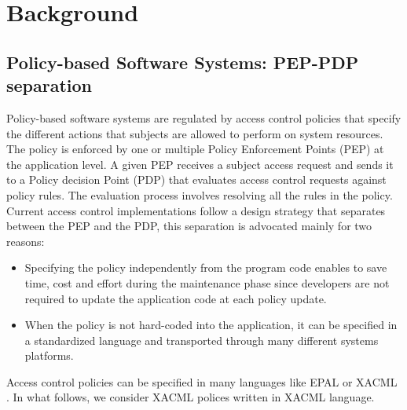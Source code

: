 
  
\section{Background}
\label{sec:background}
\subsection{Policy-based Software Systems: PEP-PDP separation}
Policy-based software systems are regulated by access control policies that specify the different actions that subjects are allowed to perform on system resources. 
The policy is enforced by one or multiple Policy Enforcement Points (PEP) at the application level. A given PEP receives a subject access request and 
sends it to a Policy decision Point (PDP) that evaluates access control requests against policy rules. The evaluation process involves resolving all the rules in the policy. 
Current access control implementations follow a design strategy that separates between the PEP and the PDP, this separation is advocated mainly for two reasons:
\begin{itemize}
\item Specifying the policy independently from the program code enables to save time, cost and effort during the maintenance phase since developers are not required 
to update the application code at each policy update.
\item When the policy is not hard-coded into the application, it can be specified in a standardized language and transported through many different systems platforms.
\end{itemize}
Access control policies can be specified in many languages like EPAL \cite{epal} or XACML \cite {oasis05:xacml}. 
In what follows, we consider XACML polices written in XACML language.


